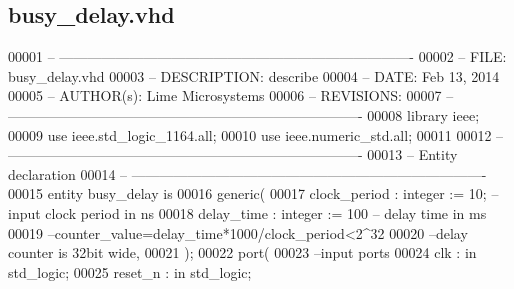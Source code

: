 \subsection{busy\+\_\+delay.\+vhd}
\label{busy__delay_8vhd_source}

\begin{DoxyCode}
00001 \textcolor{keyword}{-- ---------------------------------------------------------------------------- }
00002 \textcolor{keyword}{-- FILE:    busy\_delay.vhd}
00003 \textcolor{keyword}{-- DESCRIPTION: describe}
00004 \textcolor{keyword}{-- DATE:    Feb 13, 2014}
00005 \textcolor{keyword}{-- AUTHOR(s):   Lime Microsystems}
00006 \textcolor{keyword}{-- REVISIONS:}
00007 \textcolor{keyword}{-- ---------------------------------------------------------------------------- }
00008 \textcolor{vhdlkeyword}{library }\textcolor{keywordflow}{ieee};
00009 \textcolor{vhdlkeyword}{use }ieee.std\_logic\_1164.\textcolor{keywordflow}{all};
00010 \textcolor{vhdlkeyword}{use }ieee.numeric\_std.\textcolor{keywordflow}{all};
00011 
00012 \textcolor{keyword}{-- ----------------------------------------------------------------------------}
00013 \textcolor{keyword}{-- Entity declaration}
00014 \textcolor{keyword}{-- ----------------------------------------------------------------------------}
00015 \textcolor{keywordflow}{entity }busy_delay \textcolor{keywordflow}{is}
00016    \textcolor{keywordflow}{generic}\textcolor{vhdlchar}{(}
00017       \textcolor{vhdlchar}{clock_period}  \textcolor{vhdlchar}{:} \textcolor{comment}{integer} \textcolor{vhdlchar}{:=} \textcolor{vhdllogic}{}\textcolor{vhdllogic}{10};\textcolor{keyword}{      -- input clock period in ns}
00018       \textcolor{vhdlchar}{delay_time}        \textcolor{vhdlchar}{:} \textcolor{comment}{integer} \textcolor{vhdlchar}{:=} \textcolor{vhdllogic}{}\textcolor{vhdllogic}{100}\textcolor{keyword}{       -- delay time in ms}
00019 \textcolor{keyword}{        --counter\_value=delay\_time*1000/clock\_period<2^32}
00020 \textcolor{keyword}{        --delay counter is 32bit wide, }
00021    \textcolor{vhdlchar}{)};
00022    \textcolor{keywordflow}{port}\textcolor{vhdlchar}{(}
00023 \textcolor{keyword}{      --input ports }
00024       \textcolor{vhdlchar}{clk}      \textcolor{vhdlchar}{:} \textcolor{keywordflow}{in}  \textcolor{comment}{std\_logic};
00025       \textcolor{vhdlchar}{reset_n}  \textcolor{vhdlchar}{:} \textcolor{keywordflow}{in}  \textcolor{comment}{std\_logic};

\end{DoxyCode}
